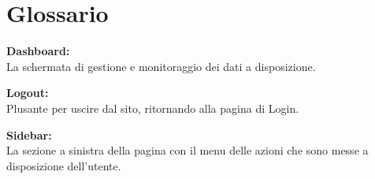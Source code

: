 \section{Glossario}
\textbf{Dashboard:}\\La schermata di gestione e monitoraggio dei dati a disposizione.

\textbf{Logout:}\\Plusante per uscire dal sito, ritornando alla pagina di Login. 

\textbf{Sidebar:}\\ La sezione a sinistra della pagina con il menu delle azioni che sono messe a disposizione dell'utente.